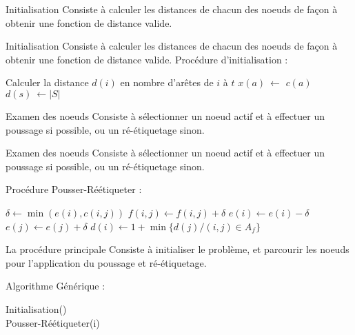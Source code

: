 
\begin{frame}{Initialisation}
	Consiste à calculer les distances de chacun des noeuds de façon à obtenir une fonction de distance
	valide.\vfill
\end{frame}

\begin{frame}{Initialisation}
	Consiste à calculer les distances de chacun des noeuds de façon à obtenir une fonction de distance
	valide.\vfill
	Procédure d'initialisation : 
	\begin{algorithmic}[1]
				\STATE Calculer la distance $d(i)$ en nombre d'arêtes de $i$ à $t$  
			\ENDFOR
				\STATE $x(a)\ \leftarrow$ $c(a)$  
			\ENDFOR
			\STATE $d(s)\ \leftarrow |S|$ 
	\end{algorithmic}
\end{frame}

\begin{frame}{Examen des noeuds}
	Consiste à sélectionner un noeud actif et à effectuer un poussage si possible, ou un ré-étiquetage
	sinon. \vfill
\end{frame}

\begin{frame}{Examen des noeuds}
	Consiste à sélectionner un noeud actif et à effectuer un poussage si possible, ou un ré-étiquetage
	sinon. \vfill

	Procédure Pousser-Réétiqueter :
	\begin{algorithmic}[1]
				\STATE $\delta \leftarrow \min(e(i), c(i,j))$
				\STATE $f(i,j) \leftarrow f(i,j) + \delta$
				\STATE $e(i) \leftarrow e(i) - \delta$
				\STATE $e(j) \leftarrow e(j) + \delta$
			\ELSE
				\STATE $d(i) \leftarrow 1 + \min\{ d(j) / (i,j) \in A_f\}$
			\ENDIF
		\ENDIF
	\end{algorithmic}\vfill
\end{frame}

\begin{frame}{La procédure principale}
	Consiste à initialiser le problème, et parcourir les noeuds pour l'application du poussage et
	ré-étiquetage.\vfill

	Algorithme Générique :
	\begin{algorithmic}[1]
			\STATE Initialisation() \\
				\STATE Pousser-Réétiqueter(i) 
			\ENDWHILE
	\end{algorithmic}\vfill
\end{frame}



